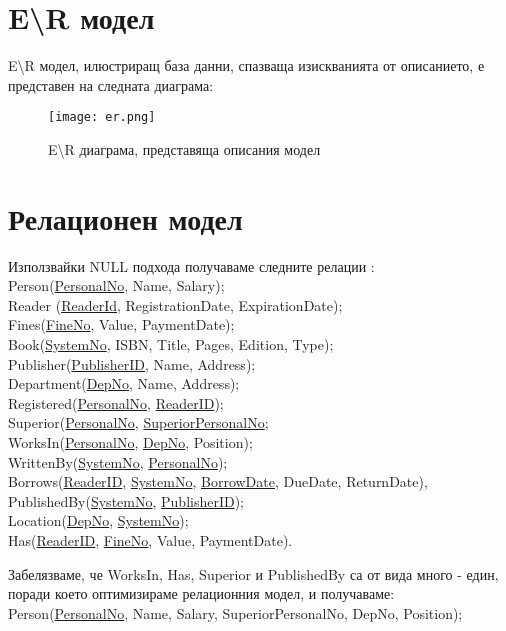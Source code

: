 \documentclass[11pt,a4paper]{article}
\begin{document}
\section{E\textbackslash R модел} 
E\textbackslash R модел, илюстриращ база данни, спазваща изискванията от описанието, е представен на следната диаграма: 
\begin{figure}[h!]
\hspace{-70pt}
\texttt{[image: er.png]}
\caption{E\textbackslash R диаграма, представяща описания модел}
\end{figure}
\pagebreak

\section{Релационен модел}
Използвайки NULL подхода получаваме следните релации :\\
Person(\underline{PersonalNo}, Name, Salary);\\
Reader (\underline{ReaderId}, RegistrationDate, ExpirationDate);\\
Fines(\underline{FineNo}, Value, PaymentDate);\\
Book(\underline{SystemNo}, ISBN, Title, Pages, Edition, Type);\\
Publisher(\underline{PublisherID}, Name, Address);\\
Department(\underline{DepNo}, Name, Address);\\
Registered(\underline{PersonalNo}, \underline{ReaderID});\\
Superior(\underline{PersonalNo}, \underline{SuperiorPersonalNo};\\
WorksIn(\underline{PersonalNo}, \underline{DepNo}, Position);\\
WrittenBy(\underline{SystemNo}, \underline{PersonalNo});\\
Borrows(\underline{ReaderID}, \underline{SystemNo}, \underline{BorrowDate}, DueDate, ReturnDate),\\
PublishedBy(\underline{SystemNo}, \underline{PublisherID});\\
Location(\underline{DepNo}, \underline{SystemNo});\\
Has(\underline{ReaderID}, \underline{FineNo}, Value, PaymentDate).\\
\par
Забелязваме, че WorksIn, Has, Superior и PublishedBy са от вида много - един, поради което оптимизираме релационния модел, и получаваме:\\
Person(\underline{PersonalNo}, Name, Salary, SuperiorPersonalNo, DepNo, Position);\\
\end{document}
